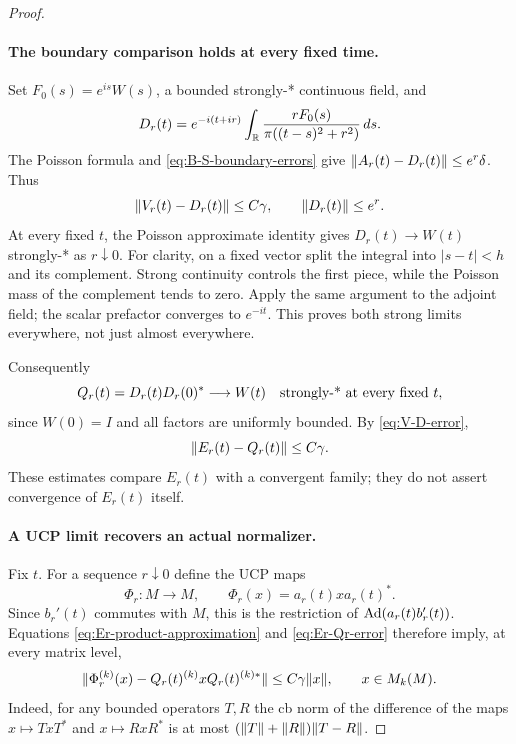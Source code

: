 \begin{proof}
\paragraph{The boundary comparison holds at every fixed time.}
Set $F_0(s)=e^{is}W(s)$, a bounded strongly-* continuous field, and
\[
 D_r(t)=e^{-i(t+ir)}\int_\mathbb R
             \frac{rF_0(s)}{\pi((t-s)^2+r^2)}\,ds.
\]
The Poisson formula and \eqref{eq:B-S-boundary-errors} give
$\lVert A_r(t)-D_r(t)\rVert\leq e^r\delta$.  Thus
\begin{equation}\label{eq:V-D-error}
 \lVert V_r(t)-D_r(t)\rVert\leq C\gamma,
 \qquad \lVert D_r(t)\rVert\leq e^r.
\end{equation}
At every fixed $t$, the Poisson approximate identity gives
$D_r(t)\to W(t)$ strongly-* as $r\downarrow0$.
For clarity, on a fixed vector split the integral into
$|s-t|<h$ and its complement.  Strong continuity controls the first
piece, while the Poisson mass of the complement tends to zero.
Apply the same argument to the adjoint field; the scalar prefactor
converges to $e^{-it}$.  This proves both strong limits everywhere,
not just almost everywhere.

Consequently
\[
 Q_r(t)=D_r(t)D_r(0)^*\longrightarrow W(t)
 \quad\hbox{strongly-* at every fixed }t,
\]
since $W(0)=I$ and all factors are uniformly bounded.  By
\eqref{eq:V-D-error},
\begin{equation}\label{eq:Er-Qr-error}
 \lVert E_r(t)-Q_r(t)\rVert\leq C\gamma.
\end{equation}
These estimates compare $E_r(t)$ with a convergent family; they do
not assert convergence of $E_r(t)$ itself.

\paragraph{A UCP limit recovers an actual normalizer.}
Fix $t$.  For a sequence $r\downarrow0$ define the UCP maps
\[
 \Phi_r:M\longrightarrow M,\qquad
 \Phi_r(x)=a_r(t)x a_r(t)^*.
\]
Since $b_r'(t)$ commutes with $M$, this is the restriction of
$\operatorname{Ad}(a_r(t)b_r'(t))$.  Equations
\eqref{eq:Er-product-approximation} and \eqref{eq:Er-Qr-error}
therefore imply, at every matrix level,
\begin{equation}\label{eq:Phi-Qr-cb}
 \lVert\Phi_r^{(k)}(x)-Q_r(t)^{(k)}xQ_r(t)^{(k)*}\rVert
        \leq C\gamma\lVert x\rVert,\qquad x\in M_k(M).
\end{equation}
Indeed, for any bounded operators $T,R$ the cb norm of the difference
of the maps $x\mapsto TxT^*$ and $x\mapsto RxR^*$ is at most
$(\lVert T\rVert+\lVert R\rVert)\lVert T-R\rVert$.


\end{proof}
